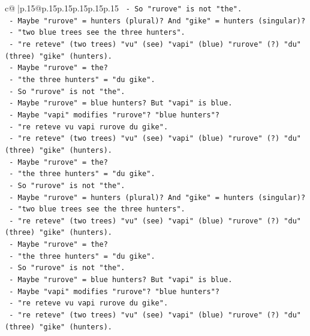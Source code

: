 \documentclass{article}
\begin{document}
{\begin{supertabular}{c@{$\;$}|p{.15\linewidth}@{}p{.15\linewidth}p{.15\linewidth}p{.15\linewidth}p{.15\linewidth}p{.15\linewidth}}
{{{\texttt{           {-} So "rurove" is not "the".} \\
\texttt{           {-} Maybe "rurove" = hunters (plural)? And "gike" = hunters (singular)?} \\
\texttt{           {-} "two blue trees see the three hunters".} \\
\texttt{           {-} "re reteve" (two trees) "vu" (see) "vapi" (blue) "rurove" (?) "du" (three) "gike" (hunters).} \\
\texttt{           {-} Maybe "rurove" = the?} \\
\texttt{           {-} "the three hunters" = "du gike".} \\
\texttt{           {-} So "rurove" is not "the".} \\
\texttt{           {-} Maybe "rurove" = blue hunters? But "vapi" is blue.} \\
\texttt{           {-} Maybe "vapi" modifies "rurove"? "blue hunters"?} \\
\texttt{           {-} "re reteve vu vapi rurove du gike".} \\
\texttt{           {-} "re reteve" (two trees) "vu" (see) "vapi" (blue) "rurove" (?) "du" (three) "gike" (hunters).} \\
\texttt{           {-} Maybe "rurove" = the?} \\
\texttt{           {-} "the three hunters" = "du gike".} \\
\texttt{           {-} So "rurove" is not "the".} \\
\texttt{           {-} Maybe "rurove" = hunters (plural)? And "gike" = hunters (singular)?} \\
\texttt{           {-} "two blue trees see the three hunters".} \\
\texttt{           {-} "re reteve" (two trees) "vu" (see) "vapi" (blue) "rurove" (?) "du" (three) "gike" (hunters).} \\
\texttt{           {-} Maybe "rurove" = the?} \\
\texttt{           {-} "the three hunters" = "du gike".} \\
\texttt{           {-} So "rurove" is not "the".} \\
\texttt{           {-} Maybe "rurove" = blue hunters? But "vapi" is blue.} \\
\texttt{           {-} Maybe "vapi" modifies "rurove"? "blue hunters"?} \\
\texttt{           {-} "re reteve vu vapi rurove du gike".} \\
\texttt{           {-} "re reteve" (two trees) "vu" (see) "vapi" (blue) "rurove" (?) "du" (three) "gike" (hunters).} \\
}}}
\end{supertabular}}
\end{document}
